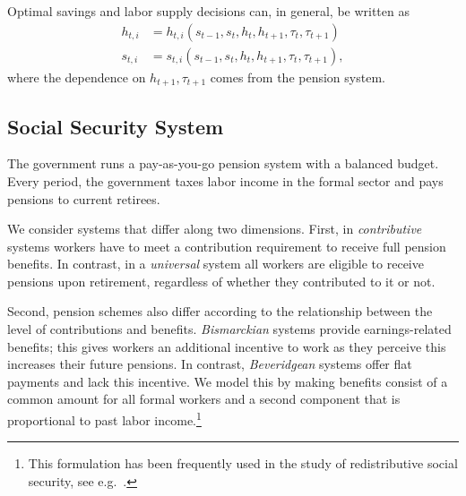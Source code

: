 Optimal savings and labor supply decisions can, in general, be written as
\begin{subequations}\label{eq:householdChoices}
\begin{align}
    h_{t,i} &= h_{t,i}\left(s_{t-1}, s_t, h_t, h_{t+1}, \tau_t, \tau_{t+1}\right) \\
    s_{t,i} &= s_{t,i}\left(s_{t-1}, s_t, h_t, h_{t+1}, \tau_t, \tau_{t+1}\right),
\end{align}
\end{subequations}
where the dependence on $h_{t+1}, \tau_{t+1}$ comes from the pension system.


\subsection{Social Security System}\label{sec:model:socialSecurity}

The government runs a pay-as-you-go pension system with a balanced budget. Every period, the government taxes labor income in the formal sector and pays pensions to current retirees. 

We consider systems that differ along two dimensions. First, in {\it contributive} systems workers have to meet a contribution requirement to receive full pension benefits. In contrast, in a {\it universal} system  all workers are eligible to receive pensions upon retirement, regardless of whether they contributed to it or not.

Second, pension schemes also differ according to the relationship between the level of contributions and benefits. {\it Bismarckian} systems provide earnings-related benefits; this gives workers an additional incentive to work as they perceive this increases their future pensions. In contrast, {\it Beveridgean} systems offer flat payments and lack this incentive. We model this by making benefits consist of a common amount for all formal workers and a second component that is proportional to past labor income.\footnote{This formulation has been frequently used in the study of redistributive social security, see e.g.\ \textcite{Casamattaa1}.} 

